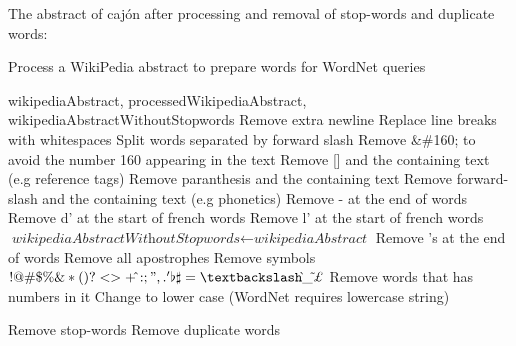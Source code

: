 The abstract of cajón after processing and removal of stop-words and duplicate words:\\

\noindent{}

\begin{algorithm}
	\caption{Process a WikiPedia abstract to prepare words for WordNet queries}\label{euclid}
	\begin{algorithmic}[1]
		\Require wikipediaAbstract,
		\Ensure processedWikipediaAbstract, wikipediaAbstractWithoutStopwords
		\State Remove extra newline
		\State Replace line breaks with whitespaces
		\State Split words separated by forward slash
		\State Remove \&\#160; to avoid the number 160 appearing in the text
		\State Remove [] and the containing text (e.g reference tags)
		\State Remove paranthesis and the containing text
		\State Remove forward-slash and the containing text (e.g phonetics)
		\State Remove - at the end of words
		\State Remove d' at the start of french words
		\State Remove l' at the start of french words
		\EndFor
		\State $\textit{wikipediaAbstractWithoutStopwords} \gets \textit{wikipediaAbstract}$
		\State Remove 's at the end of words
		\State Remove all apostrophes
		\State Remove symbols $!@\#\$\%\&*(){}?<>+\hat{}:;",.'\flat\sharp=\textbackslash\grave{}\_\tilde{}\pounds$\texteuro\textcurrency
		\State Remove words that has numbers in it
		\State Change to lower case (WordNet requires lowercase string)
		
		\State Remove stop-words
		\State Remove duplicate words
		\EndFor
		
		\State {}
		\EndProcedure
	\end{algorithmic}
\end{algorithm}


